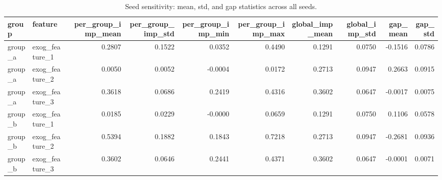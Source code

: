 \begin{table}
\caption{Seed sensitivity: mean, std, and gap statistics across all seeds.}
\label{tab:02_seed_sensitivity}
\begin{tabular}{llrrrrrrrr}
\toprule
group & feature & per_group_imp_mean & per_group_imp_std & per_group_imp_min & per_group_imp_max & global_imp_mean & global_imp_std & gap_mean & gap_std \\
\midrule
group_a & exog_feature_1 & 0.2807 & 0.1522 & 0.0352 & 0.4490 & 0.1291 & 0.0750 & -0.1516 & 0.0786 \\
group_a & exog_feature_2 & 0.0050 & 0.0052 & -0.0004 & 0.0172 & 0.2713 & 0.0947 & 0.2663 & 0.0915 \\
group_a & exog_feature_3 & 0.3618 & 0.0686 & 0.2419 & 0.4316 & 0.3602 & 0.0647 & -0.0017 & 0.0075 \\
group_b & exog_feature_1 & 0.0185 & 0.0229 & -0.0000 & 0.0659 & 0.1291 & 0.0750 & 0.1106 & 0.0578 \\
group_b & exog_feature_2 & 0.5394 & 0.1882 & 0.1843 & 0.7218 & 0.2713 & 0.0947 & -0.2681 & 0.0936 \\
group_b & exog_feature_3 & 0.3602 & 0.0646 & 0.2441 & 0.4371 & 0.3602 & 0.0647 & -0.0001 & 0.0071 \\
\bottomrule
\end{tabular}
\end{table}
